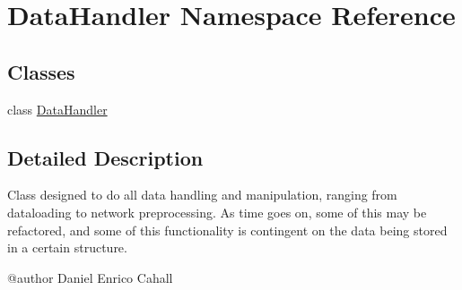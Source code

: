 \hypertarget{namespaceDataHandler}{}\section{Data\+Handler Namespace Reference}
\label{namespaceDataHandler}
\subsection*{Classes}
\begin{DoxyCompactItemize}
\item 
class \mbox{\hyperlink{classDataHandler_1_1DataHandler}{Data\+Handler}}
\end{DoxyCompactItemize}


\subsection{Detailed Description}
\begin{DoxyVerb}Class designed to do all data handling and manipulation, ranging from dataloading to network preprocessing.
As time goes on, some of this may be refactored, and some of this functionality is contingent on the data being stored 
in a certain structure. 

@author Daniel Enrico Cahall\end{DoxyVerb}
 